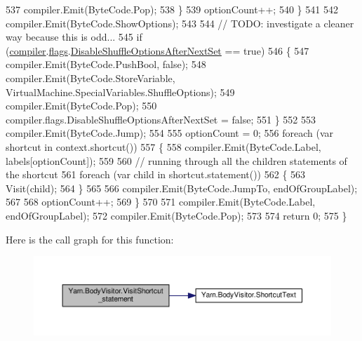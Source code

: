 \begin{DoxyCode}
537                     compiler.Emit(ByteCode.Pop);
538                 \}
539                 optionCount++;
540             \}
541 
542             compiler.Emit(ByteCode.ShowOptions);
543 
544             \textcolor{comment}{// TODO: investigate a cleaner way because this is odd...}
545             \textcolor{keywordflow}{if} (\hyperlink{a00044_a39d71c6de5e1c9f7d2f78ac2ccd5743d}{compiler}.\hyperlink{a00038_aeba873449ff9fb1c6d731ff7eb25f0a0}{flags}.\hyperlink{a00038_ae27568d71aa82edfd7841d425969a4fb}{DisableShuffleOptionsAfterNextSet}
       == \textcolor{keyword}{true})
546             \{
547                 compiler.Emit(ByteCode.PushBool, \textcolor{keyword}{false});
548                 compiler.Emit(ByteCode.StoreVariable, VirtualMachine.SpecialVariables.ShuffleOptions);
549                 compiler.Emit(ByteCode.Pop);
550                 compiler.flags.DisableShuffleOptionsAfterNextSet = \textcolor{keyword}{false};
551             \}
552 
553             compiler.Emit(ByteCode.Jump);
554 
555             optionCount = 0;
556             \textcolor{keywordflow}{foreach} (var shortcut \textcolor{keywordflow}{in} context.shortcut())
557             \{
558                 compiler.Emit(ByteCode.Label, labels[optionCount]);
559 
560                 \textcolor{comment}{// running through all the children statements of the shortcut}
561                 \textcolor{keywordflow}{foreach} (var child \textcolor{keywordflow}{in} shortcut.statement())
562                 \{
563                     Visit(child);
564                 \}
565 
566                 compiler.Emit(ByteCode.JumpTo, endOfGroupLabel);
567 
568                 optionCount++;
569             \}
570 
571             compiler.Emit(ByteCode.Label, endOfGroupLabel);
572             compiler.Emit(ByteCode.Pop);
573 
574             \textcolor{keywordflow}{return} 0;
575         \}
\end{DoxyCode}


Here is the call graph for this function\-:
\nopagebreak
\begin{figure}[H]
\begin{center}
\leavevmode
\includegraphics[width=350pt]{a00044_ad1576a22d74304c3155a0c2fa91be5b9_cgraph}
\end{center}
\end{figure}


